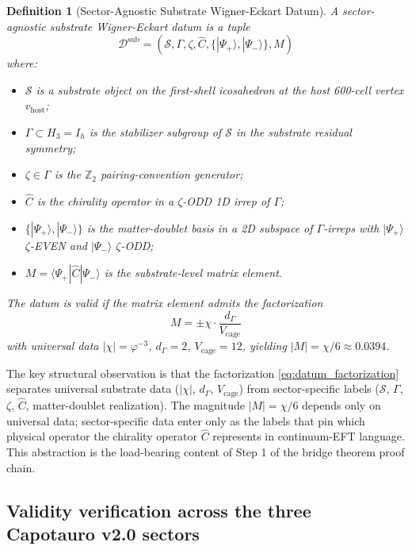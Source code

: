 \documentclass[11pt,letterpaper]{article}
\newtheorem{definition}[theorem]{Definition}
\newcommand{\Vcage}{V_{\text{cage}}}
\newcommand{\dGamma}{d_\Gamma}
\begin{document}
\begin{definition}[Sector-Agnostic Substrate Wigner-Eckart Datum]
\label{def:datum}
A \emph{sector-agnostic substrate Wigner-Eckart datum} is a tuple
\begin{equation}
\mathcal{D}^{\text{sub}} = (\mathcal{S}, \Gamma, \zeta, \hat{C}, \{|\Psi_+\rangle, |\Psi_-\rangle\}, M)
\label{eq:datum_definition}
\end{equation}
where:
\begin{itemize}[leftmargin=*]
\item $\mathcal{S}$ is a substrate object on the first-shell icosahedron at the host 600-cell vertex $v_{\text{host}}$;
\item $\Gamma \subset H_3 = I_h$ is the stabilizer subgroup of $\mathcal{S}$ in the substrate residual symmetry;
\item $\zeta \in \Gamma$ is the $\mathbb{Z}_2$ pairing-convention generator;
\item $\hat{C}$ is the chirality operator in a $\zeta$-ODD 1D irrep of $\Gamma$;
\item $\{|\Psi_+\rangle, |\Psi_-\rangle\}$ is the matter-doublet basis in a 2D subspace of $\Gamma$-irreps with $|\Psi_+\rangle$ $\zeta$-EVEN and $|\Psi_-\rangle$ $\zeta$-ODD;
\item $M = \langle \Psi_+ | \hat{C} | \Psi_- \rangle$ is the substrate-level matrix element.
\end{itemize}
The datum is \emph{valid} if the matrix element admits the factorization
\begin{equation}
M = \pm\chi \cdot \frac{\dGamma}{\Vcage}
\label{eq:datum_factorization}
\end{equation}
with universal data $|\chi| = \varphi^{-3}$, $\dGamma = 2$, $\Vcage = 12$, yielding $|M| = \chi/6 \approx 0.0394$.
\end{definition}

The key structural observation is that the factorization \eqref{eq:datum_factorization} separates universal substrate data ($|\chi|$, $\dGamma$, $\Vcage$) from sector-specific labels ($\mathcal{S}$, $\Gamma$, $\zeta$, $\hat{C}$, matter-doublet realization). The magnitude $|M| = \chi/6$ depends only on universal data; sector-specific data enter only as the labels that pin which physical operator the chirality operator $\hat{C}$ represents in continuum-EFT language. This abstraction is the load-bearing content of Step 1 of the bridge theorem proof chain.

\subsection{Validity verification across the three Capotauro v2.0 sectors}
\label{sec:validity}
\end{document}
